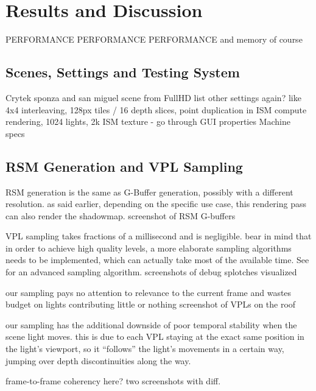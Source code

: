 

\chapter{Results and Discussion}
\label{chap:results}

PERFORMANCE PERFORMANCE PERFORMANCE
and memory of course
\section{Scenes, Settings and Testing System}
\begin{outline}
\1 Crytek sponza and san miguel scene from \citep{McGuire2011Data}
\1 FullHD
\1 list other settings again? like 4x4 interleaving, 128px tiles / 16 depth slices, point duplication in ISM compute rendering, 1024 lights, 2k ISM texture
    - go through GUI properties
\1 Machine specs
\end{outline}

\section{RSM Generation and VPL Sampling}
\begin{outline}
\1 RSM generation is the same as G-Buffer generation, possibly with a different resolution. as said earlier, depending on the specific use case, this rendering pass can also render the shadowmap.
\1 screenshot of RSM G-buffers

\1 VPL sampling takes fractions of a millisecond and is negligible. bear in mind that in order to achieve high quality levels, a more elaborate sampling algorithms needs to be implemented, which can actually take most of the available time. See \citep{hedman2016sequential} for an advanced sampling algorithm.
\1 screenshots of debug splotches visualized

\1 our sampling pays no attention to relevance to the current frame and wastes budget on lights contributing little or nothing
\1 screenshot of VPLs on the roof

\1 our sampling has the additional downside of poor temporal stability when the scene light moves. this is due to each VPL staying at the exact same position in the light's viewport, so it ``follows'' the light's movements in a certain way, jumping over depth discontinuities along the way.

\1 frame-to-frame coherency here? two screenshots with diff.
\end{outline}


